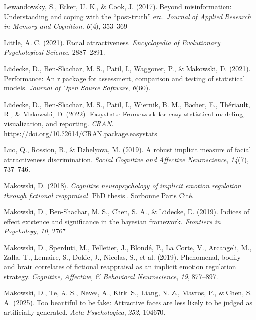 \documentclass[
  jou,
  floatsintext,
  longtable,
  nolmodern,
  notxfonts,
  notimes,
  colorlinks=true,linkcolor=blue,citecolor=blue,urlcolor=blue]{apa7}
\newlength{\cslhangindent}
\newenvironment{CSLReferences}[2] %
 {\begin{list}{}{%
  \setlength{\itemindent}{0pt}
  \setlength{\leftmargin}{0pt}
  \setlength{\parsep}{0pt}
  \ifodd #1
   \setlength{\leftmargin}{\cslhangindent}
   \setlength{\itemindent}{-1\cslhangindent}
  \fi
  \setlength{\itemsep}{#2\baselineskip}}}
 {\end{list}}
\begin{document}
\begin{CSLReferences}{1}{0}
Lewandowsky, S., Ecker, U. K., \& Cook, J. (2017). Beyond
misinformation: Understanding and coping with the {``post-truth''} era.
\emph{Journal of Applied Research in Memory and Cognition}, \emph{6}(4),
353--369.

Little, A. C. (2021). Facial attractiveness. \emph{Encyclopedia of
Evolutionary Psychological Science}, 2887--2891.

Lüdecke, D., Ben-Shachar, M. S., Patil, I., Waggoner, P., \& Makowski,
D. (2021). Performance: An r package for assessment, comparison and
testing of statistical models. \emph{Journal of Open Source Software},
\emph{6}(60).

Lüdecke, D., Ben-Shachar, M. S., Patil, I., Wiernik, B. M., Bacher, E.,
Thériault, R., \& Makowski, D. (2022). Easystats: Framework for easy
statistical modeling, visualization, and reporting. \emph{CRAN}.
\url{https://doi.org/10.32614/CRAN.package.easystats}

Luo, Q., Rossion, B., \& Dzhelyova, M. (2019). A robust implicit measure
of facial attractiveness discrimination. \emph{Social Cognitive and
Affective Neuroscience}, \emph{14}(7), 737--746.

Makowski, D. (2018). \emph{Cognitive neuropsychology of implicit emotion
regulation through fictional reappraisal} {[}PhD thesis{]}. Sorbonne
Paris Cit{é}.

Makowski, D., Ben-Shachar, M. S., Chen, S. A., \& Lüdecke, D. (2019).
Indices of effect existence and significance in the bayesian framework.
\emph{Frontiers in Psychology}, \emph{10}, 2767.

Makowski, D., Sperduti, M., Pelletier, J., Blondé, P., La Corte, V.,
Arcangeli, M., Zalla, T., Lemaire, S., Dokic, J., Nicolas, S., et al.
(2019). Phenomenal, bodily and brain correlates of fictional reappraisal
as an implicit emotion regulation strategy. \emph{Cognitive, Affective,
\& Behavioral Neuroscience}, \emph{19}, 877--897.

Makowski, D., Te, A. S., Neves, A., Kirk, S., Liang, N. Z., Mavros, P.,
\& Chen, S. A. (2025). Too beautiful to be fake: Attractive faces are
less likely to be judged as artificially generated. \emph{Acta
Psychologica}, \emph{252}, 104670.


\end{CSLReferences}
\end{document}

